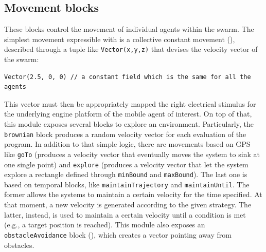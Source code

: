 \subsection{Movement blocks}\label{coordination2023-macro:subsec:base}
%
These blocks control the movement of individual agents within the swarm. 
The simplest movement expressible 
 with \MacroSwarm{} is a collective constant movement (), 
 described through a tuple 
 like \lstinline|Vector(x,y,z)|
 that devises the velocity vector of the swarm:
\begin{lstlisting}
Vector(2.5, 0, 0) // a constant field which is the same for all the agents
\end{lstlisting}
This vector must then be appropriately mapped 
 the right electrical stimulus for the underlying engine platform
 of the mobile agent of interest.
On top of that, 
 this module exposes several blocks to explore an environment. 
%
Particularly, the \lstinline|brownian| block produces a random velocity vector 
 for each evaluation of the program. 
%
In addition to that simple logic, 
 there are movements based on GPS like \lstinline|goTo| 
 (produces a velocity vector that eventually moves the system to sink at one single point)
 and \lstinline|explore| 
 (produces a velocity vector that let the system explore a rectangle defined through \lstinline|minBound| and \lstinline|maxBound|).
%
The last one is based on temporal blocks, 
  like \lstinline|maintainTrajectory| and \lstinline|maintainUntil|.
%
The former allows the systems to maintain a certain velocity for the time specified. 
 At that moment, a new velocity is generated according to the given strategy. 
% 
The latter, instead, is used to maintain a certain velocity until a condition is met 
 (e.g., a target position is reached).
%
This module also exposes an \lstinline|obstacleAvoidance| block (), which creates a vector pointing away from obstacles.


